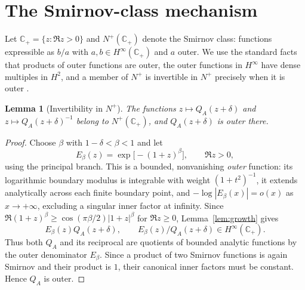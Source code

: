 \documentclass[12pt,letterpaper]{article}
\newtheorem{lemma}[theorem]{Lemma}
\theoremstyle{remark}
\numberwithin{equation}{section}
\newcommand{\C}{\mathbb C}
\newcommand{\Nplus}{N^+(\C_+)}
\begin{document}
\section{The Smirnov-class mechanism}
Let $\C_+=\{z:\Re z>0\}$ and $\Nplus$ denote the Smirnov class: functions expressible as $b/a$ with $a,b\in H^\infty(\C_+)$ and $a$ outer. We use the standard facts that products of outer functions are outer, the outer functions in $H^\infty$ have dense multiples in $H^2$, and a member of $N^+$ is invertible in $N^+$ precisely when it is outer \cite{SmirnovReference}.

\begin{lemma}[Invertibility in $N^+$]\label{lem:outer}
The functions $z\mapsto Q_A(z+\delta)$ and $z\mapsto Q_A(z+\delta)^{-1}$ belong to $\Nplus$, and $Q_A(z+\delta)$ is outer there.
\end{lemma}
\begin{proof}
Choose $\beta$ with $1-\delta<\beta<1$ and let
\[
 E_\beta(z)=\exp\big[-(1+z)^\beta\big],\qquad\Re z>0,
\]
using the principal branch. This is a bounded, nonvanishing \emph{outer} function: its logarithmic boundary modulus is integrable with weight $(1+t^2)^{-1}$, it extends analytically across each finite boundary point, and $-\log|E_\beta(x)|=o(x)$ as $x\to+\infty$, excluding a singular inner factor at infinity. Since
$\Re(1+z)^\beta\ge \cos(\pi\beta/2)|1+z|^\beta$ for $\Re z\ge0$, Lemma~\ref{lem:growth} gives
\[
 E_\beta(z)Q_A(z+\delta),\qquad
 E_\beta(z)/Q_A(z+\delta)\in H^\infty(\C_+).
\]
Thus both $Q_A$ and its reciprocal are quotients of bounded analytic functions by the outer denominator $E_\beta$. Since a product of two Smirnov functions is again Smirnov and their product is $1$, their canonical inner factors must be constant. Hence $Q_A$ is outer.
\end{proof}
\end{document}

